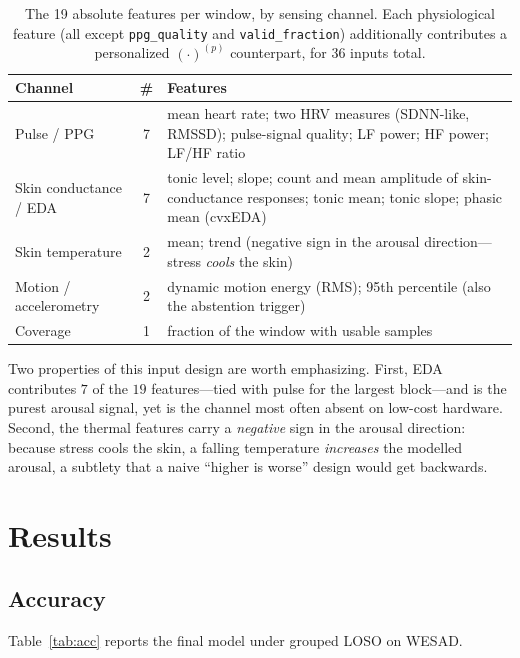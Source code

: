 \documentclass[11pt,a4paper]{article}
\begin{document}
\begin{table}[t]
\centering
\caption{The 19 absolute features per window, by sensing channel. Each physiological feature (all
except \texttt{ppg\_quality} and \texttt{valid\_fraction}) additionally contributes a personalized
$(\cdot)^{(p)}$ counterpart, for 36 inputs total.}
\label{tab:features}
\footnotesize
\renewcommand{\arraystretch}{1.2}
\begin{tabular}{p{3.0cm} c p{8.0cm}}
\toprule
\textbf{Channel} & \textbf{\#} & \textbf{Features} \\
\midrule
\rowcolor{rowalt}
Pulse / PPG & 7 & mean heart rate; two HRV measures (SDNN-like, RMSSD); pulse-signal quality; LF
power; HF power; LF/HF ratio \\
Skin conductance / EDA & 7 & tonic level; slope; count and mean amplitude of skin-conductance
responses; tonic mean; tonic slope; phasic mean (cvxEDA) \\
\rowcolor{rowalt}
Skin temperature & 2 & mean; trend (negative sign in the arousal direction---stress \emph{cools} the
skin) \\
Motion / accelerometry & 2 & dynamic motion energy (RMS); 95th percentile (also the abstention
trigger) \\
\rowcolor{rowalt}
Coverage & 1 & fraction of the window with usable samples \\
\bottomrule
\end{tabular}
\end{table}

Two properties of this input design are worth emphasizing. First, EDA contributes $7$ of the $19$
features---tied with pulse for the largest block---and is the purest arousal signal, yet is the
channel most often absent on low-cost hardware. Second, the thermal features carry a \emph{negative}
sign in the arousal direction: because stress cools the skin, a falling temperature \emph{increases}
the modelled arousal, a subtlety that a naive ``higher is worse'' design would get backwards.

\section{Results}

\subsection{Accuracy}
Table~\ref{tab:acc} reports the final model under grouped LOSO on WESAD.
\end{document}
